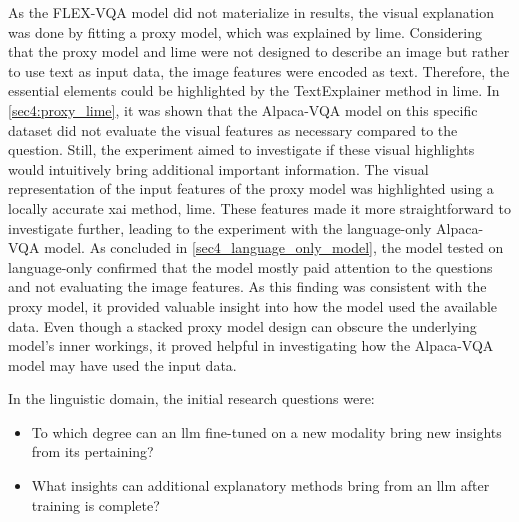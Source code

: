 As the FLEX-VQA model did not materialize in results, the visual explanation was done by fitting a proxy model, which was explained by \gls{lime}. Considering that the proxy model and \gls{lime} were not designed to describe an image but rather to use text as input data, the image features were encoded as text. Therefore, the essential elements could be highlighted by the TextExplainer method in \gls{lime}. In \autoref{sec4:proxy_lime}, it was shown that the Alpaca-VQA model on this specific dataset did not evaluate the visual features as necessary compared to the question. Still, the experiment aimed to investigate if these visual highlights would intuitively bring additional important information. The visual representation of the input features of the proxy model was highlighted using a locally accurate \gls{xai} method, \gls{lime}. These features made it more straightforward to investigate further, leading to the experiment with the language-only Alpaca-VQA model. As concluded in \autoref{sec4_language_only_model}, the model tested on language-only confirmed that the model mostly paid attention to the questions and not evaluating the image features. As this finding was consistent with the proxy model, it provided valuable insight into how the model used the available data. 
Even though a stacked proxy model design can obscure the underlying model's inner workings, it proved helpful in investigating how the Alpaca-VQA model may have used the input data.


In the linguistic domain, the initial research questions were:
\begin{itemize}
    \item To which degree can an \gls{llm} fine-tuned on a new modality bring new insights from its pertaining?

    \item What insights can additional explanatory methods bring from an \gls{llm} after training is complete?
\end{itemize}

